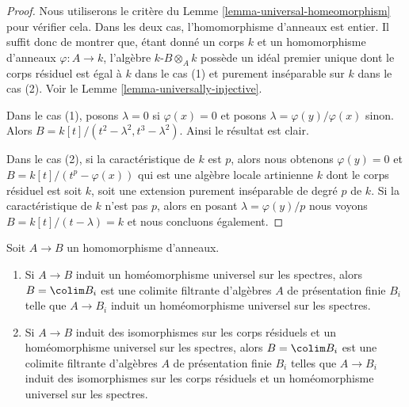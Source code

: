 \begin{proof}
Nous utiliserons le critère du Lemme \ref{lemma-universal-homeomorphism} pour vérifier cela. Dans les deux
cas, l'homomorphisme d'anneaux est entier. Il suffit donc de montrer que, étant
donné un corps $k$ et un homomorphisme d'anneaux $\varphi : A \to k$,
l'algèbre $k$-$B \otimes_A k$ possède un idéal premier
unique dont le corps résiduel est égal à $k$ dans
le cas (1) et purement inséparable sur $k$
dans le cas (2). Voir le Lemme \ref{lemma-universally-injective}.

\medskip\noindent
Dans le cas (1), posons $\lambda = 0$ si
$\varphi(x) = 0$ et posons $\lambda = \varphi(y)/\varphi(x)$ sinon.
Alors $B = k[t]/(t^2 - \lambda^2, t^3 - \lambda^2)$. Ainsi le résultat
est clair.

\medskip\noindent Dans
le cas (2), si la caractéristique de $k$ est $p$,
alors nous obtenons $\varphi(y) = 0$ et $B = k[t]/(t^p - \varphi(x))$ qui est une algèbre
locale artinienne $k$ dont le corps résiduel est soit
$k$, soit une extension purement inséparable de degré $p$
de $k$. Si la caractéristique de $k$ n'est pas
$p$, alors en posant $\lambda = \varphi(y)/p$ nous voyons $B = k[t]/(t - \lambda) = k$ et
nous concluons également.
\end{proof}

\begin{lemma}
\label{lemma-universal-homeo-limit}
Soit $A \to B$ un homomorphisme d'anneaux.
\begin{enumerate}
\item Si $A \to B$ induit un homéomorphisme universel sur les spectres, alors
$B = \colim B_i$ est une colimite filtrante d'algèbres $A$ de présentation finie $B_i$
telle que $A \to B_i$ induit un homéomorphisme universel sur les spectres.
\item Si $A \to B$ induit des isomorphismes sur les corps résiduels et un
homéomorphisme universel sur les spectres, alors $B = \colim B_i$ est une colimite
filtrante d'algèbres $A$ de présentation finie $B_i$ telles que $A \to B_i$
induit des isomorphismes sur les corps résiduels et un homéomorphisme
universel sur les spectres.
\end{enumerate}
\end{lemma}

